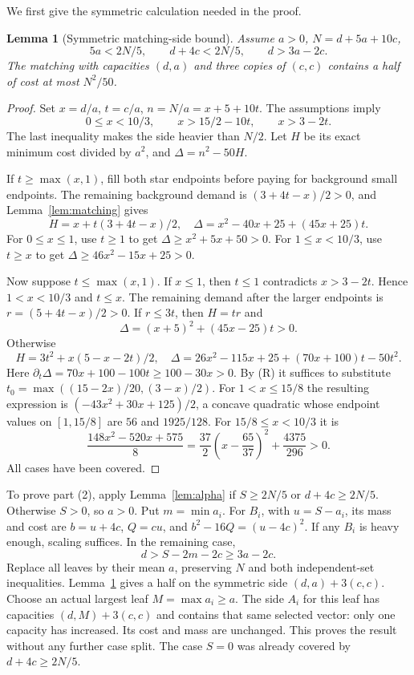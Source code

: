 \documentclass[11pt]{article}
\newtheorem{lemma}[theorem]{Lemma}
\begin{document}
We first give the symmetric calculation needed in the proof.
\begin{lemma}[Symmetric matching-side bound]\label{lem:star}
Assume $a>0$, $N=d+5a+10c$,
\[
 5a<2N/5,\qquad d+4c<2N/5,\qquad d>3a-2c .
\]
The matching with capacities $(d,a)$ and three copies of $(c,c)$
contains a half of cost at most $N^2/50$.
\end{lemma}
\begin{proof}
Set $x=d/a$, $t=c/a$, $n=N/a=x+5+10t$.
The assumptions imply
\[
 0\leq x<10/3,\qquad x>15/2-10t,\qquad x>3-2t. \tag{R}
\]
The last inequality makes the side heavier than $N/2$.
Let $H$ be its exact minimum cost divided by $a^2$, and
$\Delta=n^2-50H$.

If $t\geq\max(x,1)$, fill both star endpoints before paying for background
small endpoints. The remaining background demand is $(3+4t-x)/2>0$,
and Lemma~\ref{lem:matching} gives
\[
 H=x+t(3+4t-x)/2,\quad
 \Delta=x^2-40x+25+(45x+25)t .
\]
For $0\leq x\leq1$, use $t\geq1$ to get
$\Delta\geq x^2+5x+50>0$.
For $1\leq x<10/3$, use $t\geq x$ to get
$\Delta\geq46x^2-15x+25>0$.

Now suppose $t\leq\max(x,1)$. If $x\leq1$, then
$t\leq1$ contradicts $x>3-2t$. Hence $1<x<10/3$ and $t\leq x$.
The remaining demand after the larger endpoints is
$r=(5+4t-x)/2>0$.
If $r\leq3t$, then $H=tr$ and
\[
 \Delta=(x+5)^2+(45x-25)t>0.
\]
Otherwise
\[
 H=3t^2+x(5-x-2t)/2,\quad
 \Delta=26x^2-115x+25+(70x+100)t-50t^2 .
\]
Here $\partial_t\Delta=70x+100-100t\geq100-30x>0$.
By (R) it suffices to substitute
$t_0=\max((15-2x)/20,(3-x)/2)$.
For $1<x\leq15/8$ the resulting expression is
$(-43x^2+30x+125)/2$, a concave quadratic whose endpoint values
on $[1,15/8]$ are $56$ and $1925/128$.
For $15/8\leq x<10/3$ it is
\[
 \frac{148x^2-520x+575}{8}
 =\frac{37}{2}\left(x-\frac{65}{37}\right)^2+\frac{4375}{296}>0 .
\]
All cases have been covered.
\end{proof}

To prove part (2), apply Lemma~\ref{lem:alpha} if
$S\geq2N/5$ or $d+4c\geq2N/5$.
Otherwise $S>0$, so $a>0$.
Put $m=\min a_i$.
For $B_i$, with $u=S-a_i$, its mass and cost are
$b=u+4c$, $Q=cu$, and $b^2-16Q=(u-4c)^2$.
If any $B_i$ is heavy enough, scaling suffices.
In the remaining case,
\[
 d>S-2m-2c\geq3a-2c.
\]
Replace all leaves by their mean $a$, preserving $N$ and both
independent-set inequalities. Lemma~\ref{lem:star} gives a half on
the symmetric side $(d,a)+3(c,c)$.
Choose an actual largest leaf $M=\max a_i\geq a$.
The side $A_i$ for this leaf has capacities $(d,M)+3(c,c)$ and
contains that same selected vector: only one capacity has increased.
Its cost and mass are unchanged.
This proves the result without any further case split.
The case $S=0$ was already covered by $d+4c\geq2N/5$.
\end{document}
